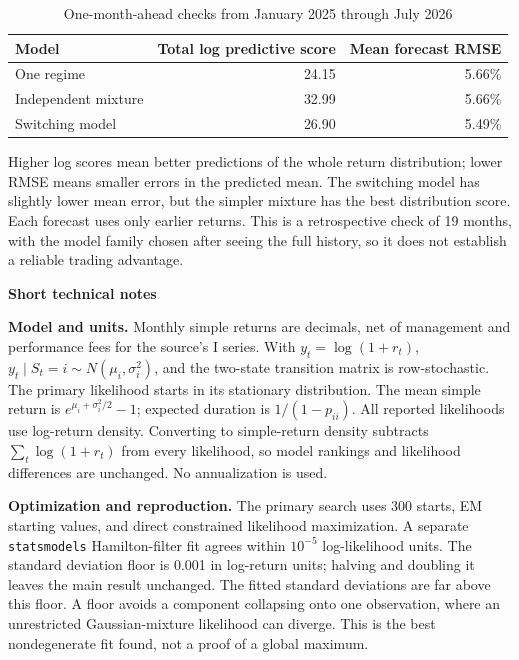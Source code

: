 \documentclass[11pt]{article}
\newcommand{\smalltitle}[1]{\vspace{5pt}\textbf{#1}\par}
\begin{document}
\begin{table}[H]\centering\small
\caption{One-month-ahead checks from January 2025 through July 2026}
\begin{tabular}{lrr}\toprule
Model & Total log predictive score & Mean forecast RMSE\\\midrule
One regime & 24.15 & 5.66\% \\
Independent mixture & 32.99 & 5.66\% \\
Switching model & 26.90 & 5.49\% \\
\bottomrule\end{tabular}
\end{table}
Higher log scores mean better predictions of the whole return distribution;
lower RMSE means smaller errors in the predicted mean. The switching model has
slightly lower mean error, but the simpler mixture has the best distribution
score. Each forecast uses only earlier returns. This is a retrospective check
of 19 months, with the model family chosen after seeing the full history, so it
does not establish a reliable trading advantage.
\newpage

\smalltitle{Short technical notes}
\textbf{Model and units.} Monthly simple returns are decimals, net of management
and performance fees for the source's I series. With $y_t=\log(1+r_t)$,
$y_t\mid S_t=i\sim N(\mu_i,\sigma_i^2)$, and the two-state transition matrix is
row-stochastic. The primary likelihood starts in its stationary distribution.
The mean simple return is $e^{\mu_i+\sigma_i^2/2}-1$; expected duration is
$1/(1-p_{ii})$. All reported likelihoods use log-return density. Converting to
simple-return density subtracts $\sum_t\log(1+r_t)$ from every likelihood, so
model rankings and likelihood differences are unchanged. No annualization is used.

\textbf{Optimization and reproduction.} The primary search uses 300 starts,
EM starting values, and direct constrained likelihood maximization. A separate
\texttt{statsmodels} Hamilton-filter fit agrees within $10^{-5}$ log-likelihood
units. The standard deviation floor is 0.001 in log-return units; halving and
doubling it leaves the main result unchanged. The fitted standard deviations
are far above this floor. A floor avoids a component collapsing onto one
observation, where an unrestricted Gaussian-mixture likelihood can diverge.
This is the best nondegenerate fit found, not a proof of a global maximum.
\end{document}
